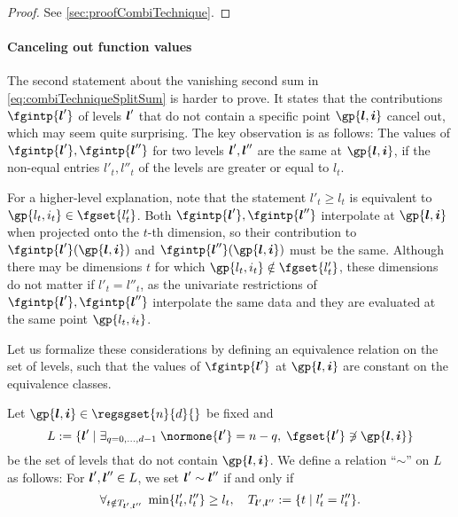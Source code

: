 \begin{proof}
  See \cref{sec:proofCombiTechnique}.
\end{proof}

\paragraph{Canceling out function values}

The second statement about the vanishing second sum in
\eqref{eq:combiTechniqueSplitSum} is harder to prove.
It states that the contributions $\fgintp{\*l'}$ of levels ${\boldsymbol{l}}'$
that do not contain a specific point $\gp{\*l,\*i}$ cancel out,
which may seem quite surprising.
The key observation is as follows:
The values of $\fgintp{\*l'}, \fgintp{\*l''}$ for two levels
${\boldsymbol{l}}', {\boldsymbol{l}}''$ are the same at $\gp{\*l,\*i}$,
if the non-equal entries $l'_t, l''_t$ of the levels are
greater or equal to $l_t$.

For a higher-level explanation,
note that the statement $l'_t \ge l_t$ is equivalent to
$\gp{l_t,i_t} \in \fgset{l'_t}$.
Both $\fgintp{\*l'}, \fgintp{\*l''}$ interpolate at
$\gp{\*l,\*i}$ when projected onto the $t$-th dimension,
so their contribution to $\fgintp{\*l'}(\gp{\*l,\*i})$ and
$\fgintp{\*l''}(\gp{\*l,\*i})$ must be the same.
Although there may be dimensions $t$ for which
$\gp{l_t,i_t} \notin \fgset{l'_t}$,
these dimensions do not matter if $l'_t = l''_t$,
as the univariate restrictions of $\fgintp{\*l'}, \fgintp{\*l''}$
interpolate the same data and they are evaluated at the same point
$\gp{l_t,i_t}$.

Let us formalize these considerations by defining an
equivalence relation on the set of levels, such that the values of
$\fgintp{\*l'}$ at $\gp{\*l,\*i}$ are constant
on the equivalence classes.

\begin{definition}
  \label{def:combiTechniqueEquivalenceRelation}
  Let $\gp{\*l,\*i} \in \regsgset{n}{d}{}$ be fixed and
  \begin{equation}
    \label{eq:combiTechniqueSpecialLevelSet}
    L
    := \{\*l' \mid \ex{q=0,\dotsc,d-1}{
      \normone{\*l'} = n - q,\; \fgset{\*l'} \notni \gp{\*l,\*i}
    }\}
  \end{equation}
  be the set of levels that do not contain $\gp{\*l,\*i}$.
  We define a relation ``$\sim$'' on $L$ as follows:
  For ${\boldsymbol{l}}', {\boldsymbol{l}}'' \in L$, we set ${\boldsymbol{l}}' \sim {\boldsymbol{l}}''$ if and only if
  \begin{equation}
    \forall_{t \notin T_{{\boldsymbol{l}}',{\boldsymbol{l}}''}}\;\min\{l'_t, l''_t\} \ge l_t,\quad
    T_{{\boldsymbol{l}}',{\boldsymbol{l}}''}
    := \{t \mid l'_t = l''_t\}.
  \end{equation}
\end{definition}

